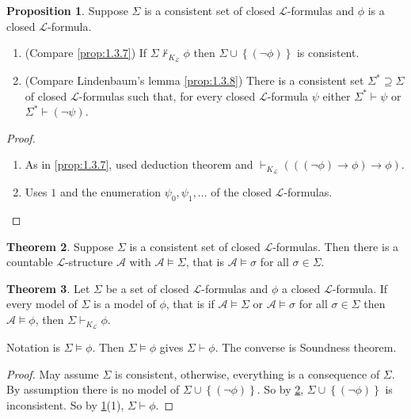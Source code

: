 \documentclass{article}
\newcommand{\A}{\mathcal{A}}
\renewcommand{\L}{\mathcal{L}}
\newcommand{\rb}[1]{\left( #1 \right)}
\newcommand{\cb}[1]{\left\{ #1 \right\}}
\newcommand{\notb}[1]{\rb{\neg #1}}
\newcommand{\impb}[2]{\rb{#1 \rightarrow #2}}
\theoremstyle{definition}\newtheorem{definition}{Definition}[subsection]
\theoremstyle{definition}\newtheorem{remark}[definition]{Remark}
\theoremstyle{definition}\newtheorem*{example}{Example}
\theoremstyle{definition}\newtheorem*{note}{Note}
\newtheorem{proposition}[definition]{Proposition}
\newtheorem{theorem}[definition]{Theorem}
\begin{document}
\begin{proposition}
\label{prop:2.5.2}
Suppose $ \Sigma $ is a consistent set of closed $ \L $-formulas and $ \phi $ is a closed $ \L $-formula.
\begin{enumerate}
\item (Compare \ref{prop:1.3.7}) If $ \Sigma \not\vdash_{K_{\L}} \phi $ then $ \Sigma \cup \cb{\notb{\phi}} $ is consistent.
\item (Compare Lindenbaum's lemma \ref{prop:1.3.8}) There is a consistent set $ \Sigma^* \supseteq \Sigma $ of closed $ \L $-formulas such that, for every closed $ \L $-formula $ \psi $ either $ \Sigma^* \vdash \psi $ or $ \Sigma^* \vdash \notb{\psi} $.
\end{enumerate}
\end{proposition}

\begin{proof}
\hfill
\begin{enumerate}
\item As in \ref{prop:1.3.7}, used deduction theorem and $ \vdash_{K_{\L}} \impb{\impb{\notb{\phi}}{\phi}}{\phi} $.
\item Uses $ 1 $ and the enumeration $ \psi_0, \psi_1, \dots $ of the closed $ \L $-formulas.
\end{enumerate}
\end{proof}

\begin{theorem}
\label{thm:2.5.3}
Suppose $ \Sigma $ is a consistent set of closed $ \L $-formulas. Then there is a countable $ \L $-structure $ \A $ with $ \A \vDash \Sigma $, that is $ \A \vDash \sigma $ for all $ \sigma \in \Sigma $.
\end{theorem}

\begin{theorem}
\label{thm:2.5.4}
Let $ \Sigma $ be a set of closed $ \L $-formulas and $ \phi $ a closed $ \L $-formula. If every model of $ \Sigma $ is a model of $ \phi $, that is if $ \A \vDash \Sigma $ or $ \A \vDash \sigma $ for all $ \sigma \in \Sigma $ then $ \A \vDash \phi $, then $ \Sigma \vdash_{K_{\L}} \phi $.
\end{theorem}

Notation is $ \Sigma \vDash \phi $. Then $ \Sigma \vDash \phi $ gives $ \Sigma \vdash \phi $. The converse is Soundness theorem.

\begin{proof}
May assume $ \Sigma $ is consistent, otherwise, everything is a consequence of $ \Sigma $. By assumption there is no model of $ \Sigma \cup \cb{\notb{\phi}} $. So by \ref{thm:2.5.3}, $ \Sigma \cup \cb{\notb{\phi}} $ is inconsistent. So by \ref{prop:2.5.2}(1), $ \Sigma \vdash \phi $.
\end{proof}
\end{document}
